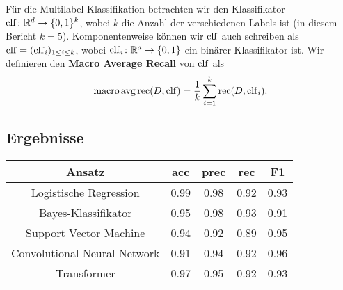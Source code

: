 Für die Multilabel-Klassifikation betrachten wir den Klassifikator $\operatorname{clf}\colon\mathbb{R}^d\to\{0, 1\}^k$, wobei $k$ die Anzahl der verschiedenen Labels ist (in diesem Bericht $k=5$). Komponentenweise können wir $\operatorname{clf}$ auch schreiben als $\operatorname{clf} = (\operatorname{clf}_i)_{1\leq i\leq k}$, wobei $\operatorname{clf}_i\colon\mathbb{R}^d\to\{0, 1\}$ ein binärer Klassifikator ist. Wir definieren den \textbf{Macro Average Recall} von $\operatorname{clf}$ als
\begin{equation*}
    \operatorname{macro\,avg\,rec}(D, \operatorname{clf}) = \frac{1}{k}\sum_{i=1}^k\operatorname{rec} (D, \operatorname{clf}_i).
\end{equation*}

\subsection{Ergebnisse}
\begin{center}
    \begin{tabular}{|c|c|c|c|c|}
        \hline
        Ansatz                       & acc  & prec & rec  & F1   \\
        \hline
        Logistische Regression       & 0.99 & 0.98 & 0.92 & 0.93 \\
        Bayes-Klassifikator          & 0.95 & 0.98 & 0.93 & 0.91 \\
        Support Vector Machine       & 0.94 & 0.92 & 0.89 & 0.95 \\
        Convolutional Neural Network & 0.91 & 0.94 & 0.92 & 0.96 \\
        Transformer                  & 0.97 & 0.95 & 0.92 & 0.93 \\
        \hline
    \end{tabular}
\end{center}
